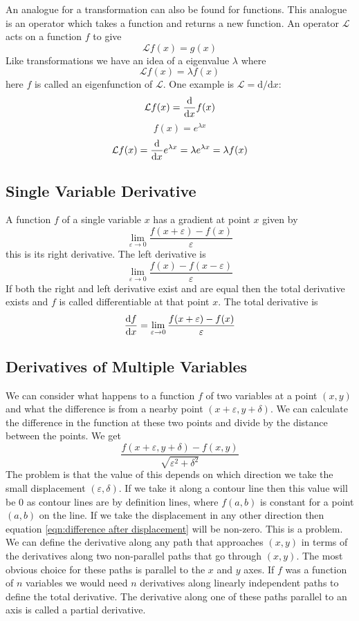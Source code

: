 \documentclass{article}
\begin{document}
    An analogue for a transformation can also be found for functions.
    This analogue is an operator which takes a function and returns a new function.
    An operator \(\mathcal L\) acts on a function \(f\) to give
    \[\mathcal L f(x) = g(x)\]
    Like transformations we have an idea of a eigenvalue \(\lambda\) where
    \[\mathcal L f(x) = \lambda f(x)\]
    here \(f\) is called an eigenfunction of \(\mathcal L\).
    One example is \(\mathcal L = \mathrm{d}/\mathrm{d}x\):
    \[\mathcal L f(x) = \dv{x}f(x)\]
    \[f(x) = e^{\lambda x}\]
    \[\mathcal L f(x) = \dv{x}e^{\lambda x} = \lambda e^{\lambda x} = \lambda f(x)\]
    
    \subsection{Single Variable Derivative}
    A function \(f\) of a single variable \(x\) has a gradient at point \(x\) given by
    \[\lim_{\varepsilon\to 0}\frac{f(x + \varepsilon) - f(x)}{\varepsilon}\]
    this is its right derivative.
    The left derivative is
    \[\lim_{\varepsilon\to 0}\frac{f(x) - f(x - \varepsilon)}{\varepsilon}\]
    If both the right and left derivative exist and are equal then the total derivative exists and \(f\) is called differentiable at that point \(x\).
    The total derivative is
    \[\dv{f}{x} =\lim_{\varepsilon\to 0}\frac{f(x + \varepsilon) - f(x)}{\varepsilon}\]
    
    \subsection{Derivatives of Multiple Variables}
    We can consider what happens to a function \(f\) of two variables at a point \((x, y)\) and what the difference is from a nearby point \((x + \varepsilon, y + \delta)\).
    We can calculate the difference in the function at these two points and divide by the distance between the points.
    We get
    \begin{equation}\label{eqn:difference after displacement}
        \frac{f(x + \varepsilon, y + \delta) - f(x, y)}{\sqrt{\varepsilon^2 + \delta^2}}
    \end{equation}
    The problem is that the value of this depends on which direction we take the small displacement \((\varepsilon, \delta)\).
    If we take it along a contour line then this value will be 0 as contour lines are by definition lines, where \(f(a, b)\) is constant for a point \((a, b)\) on the line.
    If we take the displacement in any other direction then equation \ref{eqn:difference after displacement} will be non-zero.
    This is a problem.
    We can define the derivative along any path that approaches \((x, y)\) in terms of the derivatives along two non-parallel paths that go through \((x, y)\).
    The most obvious choice for these paths is parallel to the \(x\) and \(y\) axes.
    If \(f\) was a function of \(n\) variables we would need \(n\) derivatives along linearly independent paths to define the total derivative.
    The derivative along one of these paths parallel to an axis is called a partial derivative.
    
\end{document}

